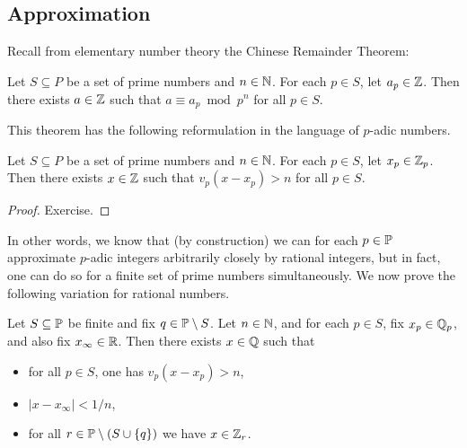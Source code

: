 \documentclass[12pt, leqno, british]{amsart}
\begin{document}
\subsection{Approximation}
Recall from elementary number theory the Chinese Remainder Theorem:
\begin{thm}\label{T:CRT}
Let $S \subseteq P$ be a set of prime numbers and $n \in \mathbb N$.
For each $p \in S$, let $a_p \in \mathbb Z$.
Then there exists $a \in \mathbb Z$ such that $a \equiv a_p \bmod p^n$ for all $p \in S$.
\end{thm}
This theorem has the following reformulation in the language of $p$-adic numbers.
\begin{cor}\label{C:CRT}
Let $S \subseteq P$ be a set of prime numbers and $n \in \mathbb N$.
For each $p \in S$, let $x_p \in \mathbb Z_p$.
Then there exists $x \in \mathbb Z$ such that $v_p(x - x_p) > n$ for all $p \in S$.
\end{cor}
\begin{proof}
Exercise.
\end{proof}
In other words, we know that (by construction) we can for each $p \in \mathbb P$ approximate $p$-adic integers arbitrarily closely by rational integers, but in fact, one can do so for a finite set of prime numbers simultaneously.
We now prove the following variation for rational numbers.
\begin{thm}
Let $S \subseteq \mathbb P$ be finite and fix $q \in \mathbb P \setminus S$.
Let $n \in \mathbb N$, and for each $p \in S$, fix $x_p \in \mathbb Q_p$, and also fix $x_\infty \in \mathbb R$.
Then there exists $x \in \mathbb Q$ such that
\begin{itemize}
\item for all $p \in S$, one has $v_p(x - x_p) > n$,
\item $\lvert x - x_\infty \rvert < 1/n$,
\item for all $r \in \mathbb P \setminus (S \cup \lbrace q \rbrace)$ we have $x \in \mathbb Z_r$.
\end{itemize} 
\end{thm}
\end{document}

